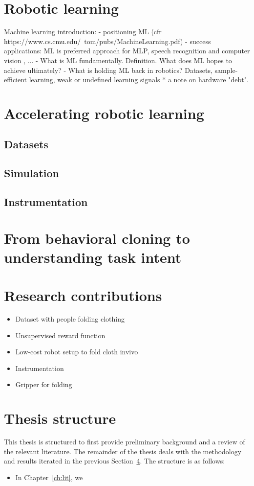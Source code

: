 \documentclass[\home/main.tex]{subfiles}
\begin{document}
\section{Robotic learning}
Machine learning introduction:
    - positioning ML (cfr https://www.cs.cmu.edu/~tom/pubs/MachineLearning.pdf)
    - success applications: ML is preferred approach for MLP, speech recognition and computer vision , ... 
    - What is ML fundamentally. Definition. What does ML hopes to achieve ultimately? 
    - What is holding ML back in robotics? 
        Datasets, sample-efficient learning, weak or undefined learning signals 
        * a note on hardware "debt".

     

\section{Accelerating robotic learning}
\subsection{Datasets}
\subsection{Simulation}
\subsection{Instrumentation}
\section{From behavioral cloning to understanding task intent}
\section{Research contributions} \label{sec:intro_contributions}
\begin{itemize}
    \item Dataset with people folding clothing
    \item Unsupervised reward function
    \item Low-cost robot setup to fold cloth invivo
    \item Instrumentation
    \item Gripper for folding
\end{itemize}

\section{Thesis structure}
This thesis is structured to first provide preliminary background and a review of the relevant literature. The remainder of the thesis deals with the methodology and results iterated in the previous Section~\ref{sec:intro_contributions}. The structure is as follows:
\begin{itemize}
    \item In Chapter~\ref{ch:lit}, we
\end{itemize}
\end{document}
